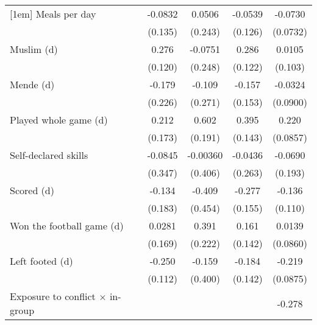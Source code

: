 {\begin{tabular}{l*{4}{c}}
[1em]
Meals per day       &     -0.0832         &      0.0506         &     -0.0539         &     -0.0730         \\
                    &     (0.135)         &     (0.243)         &     (0.126)         &    (0.0732)         \\
[1em]
Muslim (d)          &       0.276\sym{**} &     -0.0751         &       0.286\sym{**} &      0.0105         \\
                    &     (0.120)         &     (0.248)         &     (0.122)         &     (0.103)         \\
[1em]
Mende (d)           &      -0.179         &      -0.109         &      -0.157         &     -0.0324         \\
                    &     (0.226)         &     (0.271)         &     (0.153)         &    (0.0900)         \\
[1em]
Played whole game (d)&       0.212         &       0.602\sym{***}&       0.395\sym{***}&       0.220\sym{**} \\
                    &     (0.173)         &     (0.191)         &     (0.143)         &    (0.0857)         \\
[1em]
Self-declared skills&     -0.0845         &    -0.00360         &     -0.0436         &     -0.0690         \\
                    &     (0.347)         &     (0.406)         &     (0.263)         &     (0.193)         \\
[1em]
Scored (d)          &      -0.134         &      -0.409         &      -0.277\sym{*}  &      -0.136         \\
                    &     (0.183)         &     (0.454)         &     (0.155)         &     (0.110)         \\
[1em]
Won the football game (d)&      0.0281         &       0.391\sym{*}  &       0.161         &      0.0139         \\
                    &     (0.169)         &     (0.222)         &     (0.142)         &    (0.0860)         \\
[1em]
Left footed (d)     &      -0.250\sym{**} &      -0.159         &      -0.184         &      -0.219\sym{**} \\
                    &     (0.112)         &     (0.400)         &     (0.142)         &    (0.0875)         \\
[1em]
Exposure to conflict × in-group&                     &                     &                     &      -0.278         \\

\end{tabular}}

